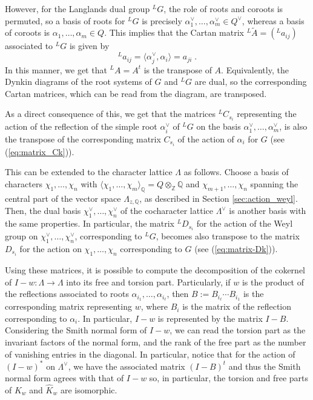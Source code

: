 \documentclass[11pt,english]{amsart}
\numberwithin{equation}{section}
\numberwithin{figure}{section}
\theoremstyle{plain}
\theoremstyle{plain}
\theoremstyle{definition}
\theoremstyle{remark}
\newcommand{\ZZ}{\mathbb{Z}}
\newcommand{\QQ}{\mathbb{Q}}
\begin{document}
    However, for the Langlands dual group $^LG$, the role of roots and coroots is permuted, so a basis of roots for $^LG$ is precisely $\alpha_1^\vee, \ldots, \alpha_m^\vee \in Q^{\vee}$, whereas a basis of coroots is $\alpha_1, \ldots, \alpha_m\in Q$. This implies that the Cartan matrix $^L\widetilde{A} = (^La_{ij})$ associated to $^LG$ is given by
    $$
        ^La_{ij} = \langle \alpha_j^\vee, \alpha_i\rangle = a_{ji}\; .
    $$
    In this manner, we get that $^LA = A^t$ is the transpose of $A$. Equivalently, the Dynkin diagrams of the root systems of $G$ and $^LG$ are dual, so the corresponding Cartan matrices, which can be read from the diagram, are transposed.
    
    As a direct consequence of this, we get that the matrices $^LC_{s_i}$ representing the action of the reflection of the simple root $\alpha_i^\vee$ of $^LG$ on the basis $\alpha_1^\vee, \ldots, \alpha_m^\vee$, is also the transpose of the corresponding matrix $C_{s_i}$ of the action of $\alpha_i$ for $G$ (see (\ref{eq:matrix_Ck})).
    
    This can be extended to the character lattice $\Lambda$ as follows. Choose a basis of characters $\chi_1, \ldots, \chi_n$ with $\langle \chi_1, \ldots, \chi_m\rangle_\QQ = Q \otimes_\ZZ \QQ$ and $\chi_{m+1}, \ldots, \chi_n$ spanning the central part of the vector space $\Lambda_{z,\mathbb{Q}}$, as described in Section \ref{sec:action_weyl}. Then, the dual basis $\chi_1^\vee, \ldots, \chi_n^\vee$ of the cocharacter lattice $\Lambda^\vee$ is another basis with the same properties. In particular, the matrix $^LD_{s_i}$ for the action of the Weyl group on $\chi_1^\vee, \ldots, \chi_n^\vee$, corresponding to $^LG$, becomes also transpose to the matrix $D_{s_i}$ for the action on $\chi_1, \ldots, \chi_n$ corresponding to $G$ (see (\ref{eq:matrix-Dk})).

    Using these matrices, it is possible to compute the decomposition of the cokernel of $I-w: \Lambda \to \Lambda$ into its free and torsion part. Particularly, if $w$ is the product of the reflections associated to roots $\alpha_{i_1}, \ldots, \alpha_{i_\ell}$, then $B := B_{i_\ell}\cdots B_{i_1}$ is the corresponding matrix representing $w$, where $B_{i}$ is the matrix of the reflection corresponding to $\alpha_i$. In particular, $I-w$ is represented by the matrix $I-B$. Considering the Smith normal form of $I-w$, we can read the torsion part as the invariant factors of the normal form, and the rank of the free part as the number of vanishing entries in the diagonal. In particular, notice that for the action of $(I-w)^*$ on $\Lambda^\vee$, we have the associated matrix $(I-B)^t$ and thus the Smith normal form agrees with that of $I-w$ so, in particular, the torsion and free parts of $K_w$ and $\hat{K}_w$ are isomorphic.
    
\end{document}
